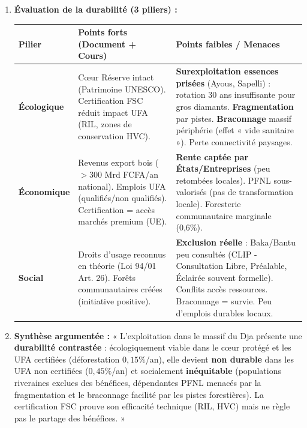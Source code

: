 \documentclass[11pt]{article}
\begin{document}
\begin{exoresolu}
\begin{enumerate}
\begin{itemize}
            \item \textbf{Impacts} : Biodiversité : déclin grands mammifères (éléphant, gorille, bongo) en périphérie. Socio-économique : Privation PFNL (bush mango, okok) pour 12 000 personnes ; conflits homme-faune ; revenus précaires (braconnage, exploitation illicite).
            \item \textbf{Réponses} : Certification FSC (efficace : déforestation $\div 3$), Foresterie communautaire (naissante : 10 000 ha sur 1,6 M ha = 0,6\%), Surveillance (écogardes), Écotourisme (potentiel Dja).
        \end{itemize}
        \item \textbf{Évaluation de la durabilité (3 piliers) :}
        \begin{center}
            \begin{tabularx}{\linewidth}{|l|X|X|}\hline
            \rowcolor{popblueL}
            \textbf{Pilier} & \textbf{Points forts (Document + Cours)} & \textbf{Points faibles / Menaces} \\ \hline
            \textbf{Écologique} & Cœur Réserve intact (Patrimoine UNESCO). Certification FSC réduit impact UFA (RIL, zones de conservation HVC). & \textbf{Surexploitation essences prisées} (Ayous, Sapelli) : rotation 30 ans insuffisante pour gros diamants. \textbf{Fragmentation} par pistes. \textbf{Braconnage} massif périphérie (effet « vide sanitaire »). Perte connectivité paysages. \\ \hline
            \textbf{Économique} & Revenus export bois ($> 300$ Mrd FCFA/an national). Emplois UFA (qualifiés/non qualifiés). Certification = accès marchés premium (UE). & \textbf{Rente captée par États/Entreprises} (peu retombées locales). PFNL sous-valorisés (pas de transformation locale). Foresterie communautaire marginale (0,6\%). \\ \hline
            \textbf{Social} & Droits d'usage reconnus en théorie (Loi 94/01 Art. 26). Forêts communautaires créées (initiative positive). & \textbf{Exclusion réelle} : Baka/Bantu peu consultés (CLIP - Consultation Libre, Préalable, Éclairée souvent formelle). Conflits accès ressources. Braconnage = survie. Peu d'emplois durables locaux. \\ \hline
        \end{tabularx}
    \end{center}
    \item \textbf{Synthèse argumentée :}
    « L'exploitation dans le massif du Dja présente une \textbf{durabilité contrastée} : écologiquement viable dans le cœur protégé et les UFA certifiées (déforestation $0,15\%$/an), elle devient \textbf{non durable} dans les UFA non certifiées ($0,45\%$/an) et socialement \textbf{inéquitable} (populations riveraines exclues des bénéfices, dépendantes PFNL menacés par la fragmentation et le braconnage facilité par les pistes forestières). La certification FSC prouve son efficacité technique (RIL, HVC) mais ne règle pas le partage des bénéfices. »

\end{enumerate}
\end{exoresolu}
\end{document}
